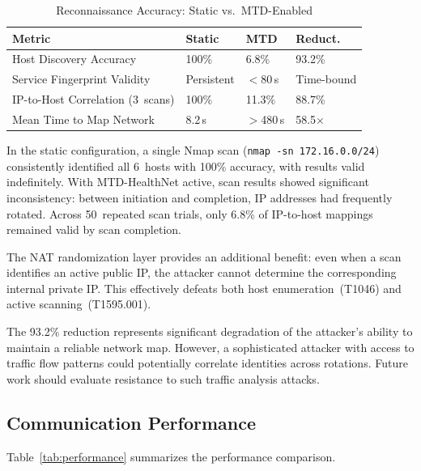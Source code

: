\documentclass[conference]{IEEEtran}
\begin{document}
\begin{table}[htbp]
\caption{Reconnaissance Accuracy: Static vs.\ MTD-Enabled}
\label{tab:recon}
\centering
\footnotesize
\begin{tabular}{p{2.2cm}p{1.5cm}p{1.7cm}p{1.2cm}}
\toprule
\textbf{Metric} & \textbf{Static} & \textbf{MTD} & \textbf{Reduct.} \\
\midrule
Host Discovery Accuracy & 100\% & 6.8\% & 93.2\% \\
\addlinespace
Service Fingerprint Validity & Persistent & $<$80\,s & Time-bound \\
\addlinespace
IP-to-Host Correlation (3~scans) & 100\% & 11.3\% & 88.7\% \\
\addlinespace
Mean Time to Map Network & 8.2\,s & $>$480\,s & 58.5$\times$ \\
\bottomrule
\end{tabular}
\end{table}

In the static configuration, a single Nmap scan (\texttt{nmap -sn 172.16.0.0/24}) consistently identified all 6~hosts with 100\% accuracy, with results valid indefinitely. With MTD-HealthNet active, scan results showed significant inconsistency: between initiation and completion, IP addresses had frequently rotated. Across 50~repeated scan trials, only 6.8\% of IP-to-host mappings remained valid by scan completion.

The NAT randomization layer provides an additional benefit: even when a scan identifies an active public IP, the attacker cannot determine the corresponding internal private IP. This effectively defeats both host enumeration~(T1046) and active scanning~(T1595.001).

The 93.2\% reduction represents significant degradation of the attacker's ability to maintain a reliable network map. However, a sophisticated attacker with access to traffic flow patterns could potentially correlate identities across rotations. Future work should evaluate resistance to such traffic analysis attacks.

\subsection{Communication Performance}

Table~\ref{tab:performance} summarizes the performance comparison.
\end{document}
